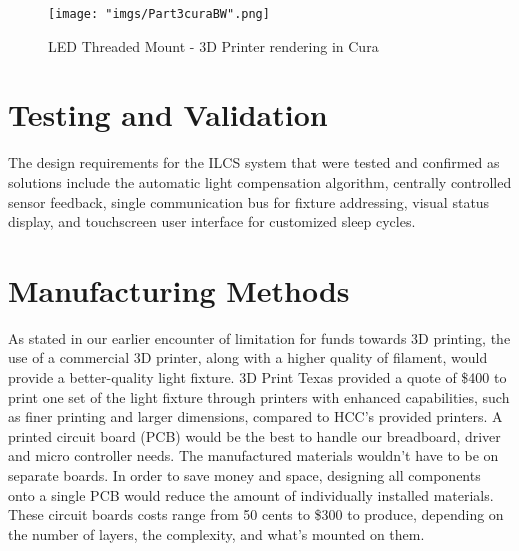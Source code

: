 \documentclass[12pt,a4paper]{report}
\begin{document}
\begin{figure}[H]
	\centering
	\texttt{[image: "imgs/Part3curaBW".png]}\par			\vspace{0.1cm}
	\caption{LED Threaded Mount - 3D Printer rendering in Cura}
\end{figure}

\section{Testing and Validation}
The design requirements for the ILCS system that were tested and confirmed as solutions  include the automatic light compensation algorithm, centrally controlled sensor feedback, single communication bus for fixture addressing, visual status display, and touchscreen user interface for customized sleep cycles. \\



\section{Manufacturing Methods}
As stated in our earlier encounter of limitation for funds towards 3D printing, the use of a commercial 3D printer, along with a higher quality of filament, would provide a better-quality light fixture. 3D Print Texas provided a quote of \$400 to print one set of the light fixture through printers with enhanced capabilities, such as finer printing and larger dimensions, compared to HCC's provided printers.
A printed circuit board (PCB) would be the best to handle our breadboard, driver and micro controller needs. The manufactured materials wouldn't have to be on separate boards. In order to save money and space, designing all components onto a single PCB would reduce the amount of individually installed materials. These circuit boards costs range from 50 cents to \$300 to produce, depending on the number of layers, the complexity, and what's mounted on them.
\end{document}
